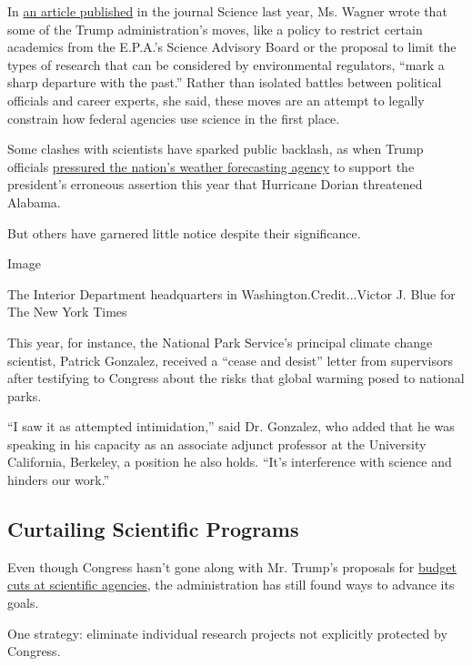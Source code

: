 In \href{https://science.sciencemag.org/content/362/6415/636.summary}{an
article published} in the journal Science last year, Ms. Wagner wrote
that some of the Trump administration's moves, like a policy to restrict
certain academics from the E.P.A.'s Science Advisory Board or the
proposal to limit the types of research that can be considered by
environmental regulators, ``mark a sharp departure with the past.''
Rather than isolated battles between political officials and career
experts, she said, these moves are an attempt to legally constrain how
federal agencies use science in the first place.

Some clashes with scientists have sparked public backlash, as when Trump
officials
\href{https://www.nytimes3xbfgragh.onion/2019/09/11/us/politics/trump-alabama-noaa.html}{pressured
the nation's weather forecasting agency} to support the president's
erroneous assertion this year that Hurricane Dorian threatened Alabama.

But others have garnered little notice despite their significance.

Image

The Interior Department headquarters in Washington.Credit...Victor J.
Blue for The New York Times

This year, for instance, the National Park Service's principal climate
change scientist, Patrick Gonzalez, received a ``cease and desist''
letter from supervisors after testifying to Congress about the risks
that global warming posed to national parks.

``I saw it as attempted intimidation,'' said Dr. Gonzalez, who added
that he was speaking in his capacity as an associate adjunct professor
at the University California, Berkeley, a position he also holds. ``It's
interference with science and hinders our work.''

\hypertarget{curtailing-scientific-programs}{%
\subsection{Curtailing Scientific
Programs}\label{curtailing-scientific-programs}}

Even though Congress hasn't gone along with Mr. Trump's proposals for
\href{https://www.whitehouse.gov/sites/whitehouse.gov/files/omb/budget/fy2018/msar.pdf}{budget
cuts at scientific agencies}, the administration has still found ways to
advance its goals.

One strategy: eliminate individual research projects not explicitly
protected by Congress.

